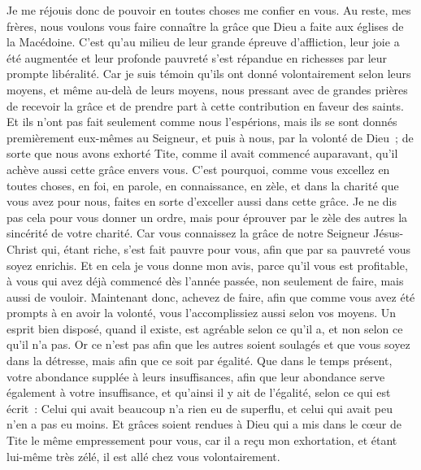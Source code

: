 \begin{multicols}{2}
Je me réjouis donc de pouvoir en toutes choses me confier en vous.
\VerseOne{}Au reste, mes frères, nous voulons vous faire connaître la grâce que Dieu a faite aux églises de la Macédoine.
C'est qu'au milieu de leur grande épreuve d'affliction, leur joie a été augmentée et leur profonde pauvreté s'est répandue en richesses par leur prompte libéralité.
Car je suis témoin qu'ils ont donné volontairement selon leurs moyens, et même au-delà de leurs moyens,
nous pressant avec de grandes prières de recevoir la grâce et de prendre part à cette contribution en faveur des saints.
Et ils n'ont pas fait seulement comme nous l'espérions, mais ils se sont donnés premièrement eux-mêmes au Seigneur, et puis à nous, par la volonté de Dieu~;
de sorte que nous avons exhorté Tite, comme il avait commencé auparavant, qu'il achève aussi cette grâce envers vous.
C'est pourquoi, comme vous excellez en toutes choses, en foi, en parole, en connaissance, en zèle, et dans la charité que vous avez pour nous, faites en sorte d'exceller aussi dans cette grâce.
Je ne dis pas cela pour vous donner un ordre, mais pour éprouver par le zèle des autres la sincérité de votre charité.
Car vous connaissez la grâce de notre Seigneur Jésus-Christ qui, étant riche, s'est fait pauvre pour vous, afin que par sa pauvreté vous soyez enrichis.
Et en cela je vous donne mon avis, parce qu'il vous est profitable, à vous qui avez déjà commencé dès l'année passée, non seulement de faire, mais aussi de vouloir.
Maintenant donc, achevez de faire, afin que comme vous avez été prompts à en avoir la volonté, vous l'accomplissiez aussi selon vos moyens.
Un esprit bien disposé, quand il existe, est agréable selon ce qu'il a, et non selon ce qu'il n'a pas.
Or ce n'est pas afin que les autres soient soulagés et que vous soyez dans la détresse, mais afin que ce soit par égalité. Que dans le temps présent, votre abondance supplée à leurs insuffisances,
afin que leur abondance serve également à votre insuffisance, et qu'ainsi il y ait de l'égalité,
selon ce qui est écrit~: Celui qui avait beaucoup n'a rien eu de superflu, et celui qui avait peu n'en a pas eu moins.
Et grâces soient rendues à Dieu qui a mis dans le cœur de Tite le même empressement pour vous,
car il a reçu mon exhortation, et étant lui-même très zélé, il est allé chez vous volontairement.

\end{multicols}
